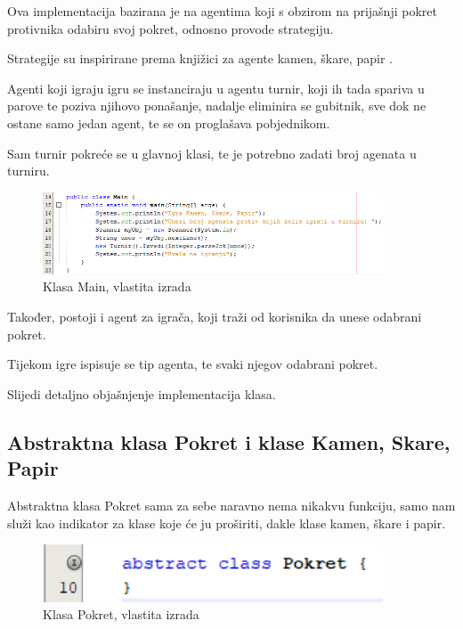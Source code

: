 \documentclass{foi}
\begin{document}
Ova implementacija bazirana je na agentima koji s obzirom na prijašnji pokret protivnika odabiru svoj pokret, odnosno provode strategiju.

Strategije su inspirirane prema knjižici za agente kamen, škare, papir \cite{agentcomparison}.

Agenti koji igraju igru se instanciraju u agentu turnir, koji ih tada spariva u parove te poziva njihovo ponašanje, nadalje eliminira se gubitnik, sve dok ne ostane samo jedan agent, te se on proglašava pobjednikom.

Sam turnir pokreće se u glavnoj klasi, te je potrebno zadati broj agenata u turniru.

\begin{figure}[h!]
    \centering
    \includegraphics[width=0.9\textwidth]{slike/Screenshot_3.png}
    \caption{Klasa Main, vlastita izrada}
\end{figure}

Također, postoji i agent za igrača, koji traži od korisnika da unese odabrani pokret.

Tijekom igre ispisuje se tip agenta, te svaki njegov odabrani pokret.

Slijedi detaljno objašnjenje implementacija klasa.

\clearpage

\subsection{Abstraktna klasa Pokret i  klase Kamen, Skare, Papir}

Abstraktna klasa Pokret sama za sebe naravno nema nikakvu funkciju, samo nam služi kao indikator za klase koje će ju proširiti, dakle klase kamen, škare i papir.

\begin{figure}[h!]
    \centering
    \includegraphics[width=0.9\textwidth]{slike/Screenshot_1.png}
    \caption{Klasa Pokret, vlastita izrada}
\end{figure}
\end{document}

